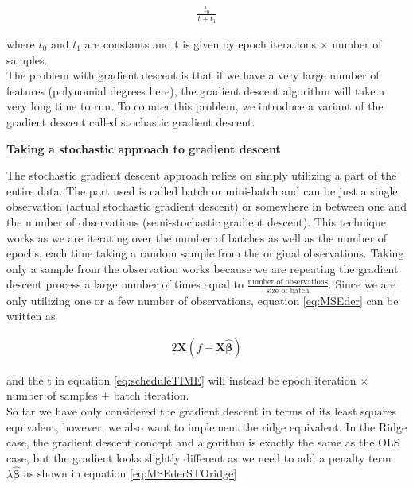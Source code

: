 \documentclass[12pt,a4paper]{article}
\begin{document}
\begin{equation}\label{eq:scheduleTIME}
\begin{aligned}
\frac{t_0}{t + t_1}
\end{aligned}
\end{equation}

\noindent where $t_0$ and $t_1$ are constants and t is given by epoch iterations $\times$ number of samples. 
\\
The problem with gradient descent is that if we have a very large number of features (polynomial degrees here), the gradient descent algorithm will take a very long time to run. To counter this problem, we introduce a variant of the gradient descent called stochastic gradient descent.

\begin{center}
\large{\textbf{Taking a stochastic approach to gradient descent}}
\end{center}

\noindent The stochastic gradient descent approach relies on simply utilizing a part of the entire data. The part used is called batch or mini-batch and can be just a single observation (actual stochastic gradient descent) or somewhere in between one and the number of observations (semi-stochastic gradient descent). This technique works as we are iterating over the number of batches as well as the number of epochs, each time taking a random sample from the original observations. Taking only a sample from the observation works because we are repeating the gradient descent process a large number of times equal to $\frac{\textrm{number of observations}}{\textrm{size of batch}}$. Since we are only utilizing one or a few number of observations, equation \ref{eq:MSEder} can be written as

\begin{equation}\label{eq:MSEderSTO}
\begin{aligned}
2 \textbf{X}(f - \textbf{X}\boldsymbol{\hat{\beta}}) 
\end{aligned}
\end{equation}

\noindent and the t in equation \ref{eq:scheduleTIME} will instead be epoch iteration $\times$ number of samples $+$ batch iteration.
\\
So far we have only considered the gradient descent in terms of its least squares equivalent, however, we also want to implement the ridge equivalent. In the Ridge case, the gradient descent concept and algorithm is exactly the same as the OLS case, but the gradient looks slightly different as we need to add a penalty term $\lambda \boldsymbol{\hat{\beta}}$ as shown in equation \ref{eq:MSEderSTOridge}
\end{document}

